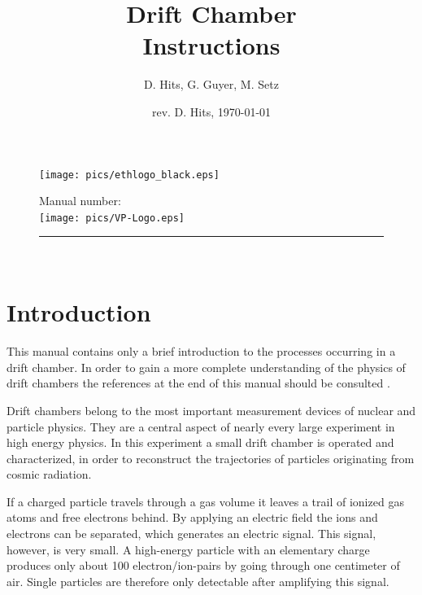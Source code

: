 \documentclass[12pt]{article}
\begin{document}
\begin{figure}
\begin{minipage}{0.5\linewidth}
\begin{flushleft}
\texttt{[image: pics/ethlogo\_black.eps]}
\end{flushleft}
\end{minipage}
\hspace{0.05cm}
\begin{minipage}{0.5\linewidth}
\begin{flushright}
Manual number:\hspace{2cm}\\[0.5cm]
\texttt{[image: pics/VP-Logo.eps]}
\end{flushright}
\end{minipage}
\hrule height 1pt\hfill \\[3cm]
\end{figure} 

\title{Drift Chamber\\ Instructions}
\author{D. Hits, G. Guyer, M. Setz}
\date{rev. D. Hits, \today}
\maketitle

\newpage
\section{Introduction}

This manual contains only a brief introduction to the processes occurring in a drift chamber. In order to gain a more complete understanding of the physics of drift chambers the references at the end of this manual should be consulted \cite{DriftChamberBook, knoll, NIMwiki}. 

Drift chambers belong to the most important measurement devices of nuclear and particle physics. They are a central aspect of nearly every large experiment in high energy physics. In this experiment a small drift chamber is operated and characterized, in order to reconstruct the trajectories of particles originating from cosmic radiation. 

If a charged particle travels through a gas volume it leaves a trail of ionized gas atoms and free electrons behind. By applying an electric field the ions and electrons can be separated, which generates an electric signal. This signal, however, is very small. A high-energy particle with an elementary charge produces only about 100 electron/ion-pairs by going through one centimeter of air. Single particles are therefore only detectable after amplifying this signal. 
\end{document}
